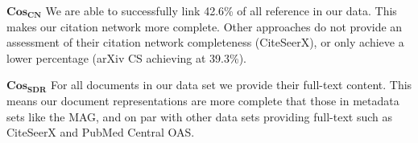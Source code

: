 $\mathbf{Cos_{CN}}$ We are able to successfully link 42.6\% of all reference in our data. This makes our citation network more complete. Other approaches do not provide an assessment of their citation network completeness (CiteSeerX), or only achieve a lower percentage (arXiv CS achieving at 39.3\%).

$\mathbf{Cos_{SDR}}$ For all documents in our data set we provide their full-text content. This means our document representations are more complete that those in metadata sets like the MAG, and on par with other data sets providing full-text such as CiteSeerX and PubMed Central OAS. \\








% 


%
%

